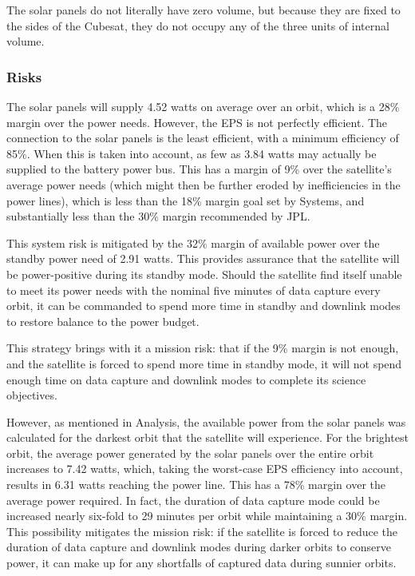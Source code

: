 \documentclass[12pt]{article}
\begin{document}
The solar panels do not literally have zero volume, but because they are fixed to the sides of the Cubesat, they do not occupy any of the three units of internal volume.

			\subsubsection{Risks}

The solar panels will supply 4.52 watts on average over an orbit, which is a 28\% margin over the power needs.  However, the EPS is not perfectly efficient.  The connection to the solar panels is the least efficient, with a minimum efficiency of 85\%\cite[p.~9]{EPS-manual}.  When this is taken into account, as few as 3.84 watts may actually be supplied to the battery power bus.  This has a margin of 9\% over the satellite's average power needs (which might then be further eroded by inefficiencies in the power lines), which is less than the 18\% margin goal set by Systems, and substantially less than the 30\% margin recommended by JPL.

This system risk is mitigated by the 32\% margin of available power over the standby power need of 2.91 watts.  This provides assurance that the satellite will be power-positive during its standby mode.  Should the satellite find itself unable to meet its power needs with the nominal five minutes of data capture every orbit, it can be commanded to spend more time in standby and downlink modes to restore balance to the power budget.

This strategy brings with it a mission risk: that if the 9\% margin is not enough, and the satellite is forced to spend more time in standby mode, it will not spend enough time on data capture and downlink modes to complete its science objectives.

However, as mentioned in Analysis, the available power from the solar panels was calculated for the darkest orbit that the satellite will experience.  For the brightest orbit, the average power generated by the solar panels over the entire orbit increases to 7.42 watts, which, taking the worst-case EPS efficiency into account, results in 6.31 watts reaching the power line.  This has a 78\% margin over the average power required.  In fact, the duration of data capture mode could be increased nearly six-fold to 29 minutes per orbit while maintaining a 30\% margin.  This possibility mitigates the mission risk: if the satellite is forced to reduce the duration of data capture and downlink modes during darker orbits to conserve power, it can make up for any shortfalls of captured data during sunnier orbits.
\end{document}
